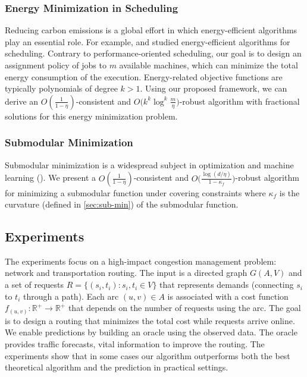 \subsubsection{Energy Minimization in Scheduling}
Reducing carbon emissions is a global effort in which energy-efficient algorithms play an essential role. For example, \cite{Albers10:Energy-efficient-algorithms} and \cite{GuCaiZengZhangJinDai:2019} studied energy-efficient algorithms for scheduling. Contrary to performance-oriented scheduling, our goal is to design an assignment policy of jobs to $m$ available machines, which can minimize the total energy consumption of the execution. Energy-related objective functions are typically polynomials of degree $k > 1$. Using our proposed framework, we can derive an $O(\frac{1}{1 - \eta})$-consistent and $O\bigl(k^{k} \log^{k} \frac{m}{\eta}\bigr)$-robust algorithm with fractional solutions for this energy minimization problem.

\subsubsection{Submodular Minimization}
Submodular minimization is a widespread subject in optimization and machine learning (\cite{IwataFleischer01:A-combinatorial-strongly,Bachothers13:Learning-with,Bach16:Submodular-functions:,BalkanskiSinger:2020}). We present a
$O(\frac{1}{1 - \eta})$-consistent and $O\bigl( \frac{\log (d/\eta)}{1 - \kappa_{f}} \bigr)$-robust algorithm
for minimizing a submodular function under covering constraints where $\kappa_{f}$ is the curvature
(defined in \cref{sec:sub-min}) of the submodular function.

\subsection{Experiments}
The experiments focus on a high-impact congestion management problem: network and transportation routing. The input is a directed graph $G(A,V)$ and a set of requests $R = \{(s_{i}, t_{i}) : s_{i}, t_{i} \in V\}$ that represents demands (connecting $s_{i}$ to $t_{i}$ through a path). Each arc $(u, v) \in A$ is associated with a cost function $f_{(u,v)}: \mathbb{R}^{+} \rightarrow \mathbb{R}^{+}$ that depends on the number of requests using the arc. The goal is to design a routing that minimizes the total cost while requests arrive online. We enable predictions by building an oracle using the observed data. The oracle provides traffic forecasts, vital information to improve the routing. The experiments show that in some cases our algorithm outperforms both the best theoretical algorithm and the prediction in practical settings.


